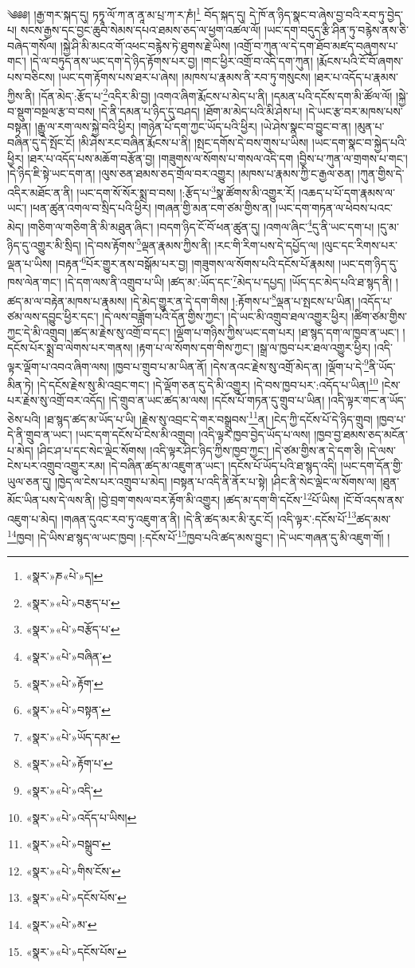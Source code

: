 ༄༅༅། །རྒྱ་གར་སྐད་དུ། ཏཏྭཱ་ལོ་ཀ་ན་ནཱ་མ་པྲ་ཀ་ར་ཎཾ།\footnote{«སྣར་»ཎ«པེ་»ད།} བོད་སྐད་དུ། དེ་ཁོ་ན་ཉིད་སྣང་བ་ཞེས་བྱ་བའི་རབ་ཏུ་བྱེད་པ། སངས་རྒྱས་དང་བྱང་ཆུབ་སེམས་དཔའ་ཐམས་ཅད་ལ་ཕྱག་འཚལ་ལོ། །ཡང་དག་བདུད་རྩི་ཤིན་ཏུ་བརྙེས་ནས་ཅི་བཞེད་གསོལ། །སྐྱེ་ཤི་མི་མངའ་གོ་འཕང་བརྙེས་ཏེ་ཐུགས་རྗེ་ཡིས། །འགྲོ་བ་ཀུན་ལ་དེ་དག་ཐོབ་མཛད་བཞུགས་པ་གང་། །དེ་ལ་བཏུད་ནས་ཡང་དག་དེ་ཉིད་རྟོགས་པར་བྱ། །གང་ཕྱིར་འགྲོ་བ་འདི་དག་ཀུན། །རྨོངས་པའི་ངོ་བོ་ཞགས་པས་བཅིངས། །ཡང་དག་རྟོགས་པས་ཐར་པ་ཞེས། །མཁས་པ་རྣམས་ནི་རབ་ཏུ་གསུངས། །ཐར་པ་འདོད་པ་རྣམས་ཀྱིས་ནི། །དོན་མེད་:རྩོད་པ་\footnote{«སྣར་»«པེ་»བརྩད་པ་}འདིར་མི་བྱ། །འགའ་ཞིག་རྨོངས་པ་མེད་པ་ནི། །དམན་པའི་དངོས་དག་མི་ཚོལ་ལོ། །སྐྱེ་བ་སྡུག་བསྔལ་རྩ་བ་བས། །དེ་ནི་དམན་པ་ཉིད་དུ་བཤད། །ཐོག་མ་མེད་པའི་མི་ཤེས་པ། །དེ་ཡང་རྩ་བར་མཁས་པས་བསྟན། །རྒྱུ་ལ་རག་ལས་སྐྱེ་བའི་ཕྱིར། །གཉེན་པོ་དག་ཀྱང་ཡོད་པའི་ཕྱིར། །ཡེ་ཤེས་སྣང་བ་བྱུང་བ་ན། །མུན་པ་བཞིན་དུ་དེ་སྤོང་ངོ། །མི་ཤེས་རང་བཞིན་རྨོངས་པ་ནི། །སྤང་དགོས་དེ་བས་གུས་པ་ཡིས། །ཡང་དག་སྣང་བ་སྐྱེད་པའི་ཕྱིར། །ཐར་པ་འདོད་པས་མཆོག་བརྩོན་བྱ། །གཟུགས་ལ་སོགས་པ་གསལ་འདི་དག །བྱིས་པ་ཀུན་ལ་གྲགས་པ་གང་། །དེ་ཉིད་ཇི་སྟེ་ཡང་དག་ན། །ལུས་ཅན་ཐམས་ཅད་གྲོལ་བར་འགྱུར། །མཁས་པ་རྣམས་ཀྱི་ང་རྒྱལ་ཅན། །ཀུན་གྱིས་དེ་འདིར་མཐོང་ན་ནི། །ཡང་དག་སོ་སོར་སྨྲ་བ་བས། །:རྩོད་པ་\footnote{«སྣར་»«པེ་»བརྩོད་པ་}སྣ་ཚོགས་མི་འགྱུར་རོ། །འཆད་པ་པོ་དག་རྣམས་ལ་ཡང་། །ཕན་ཚུན་འགལ་བ་སྲིད་པའི་ཕྱིར། །གཞན་གྱི་མན་ངག་ཙམ་གྱིས་ན། །ཡང་དག་གཏན་ལ་ཕེབས་པའང་མེད། །གཅིག་ལ་གཅིག་ནི་མི་མཐུན་ཞིང་། །བདག་ཉིད་ངོ་བོ་ཕན་ཚུན་དུ། །འགལ་ཞིང་\footnote{«སྣར་»«པེ་»བཞིན་}དུ་ནི་ཡང་དག་པ། །དུ་མ་ཉིད་དུ་འགྱུར་མི་སྲིད། །དེ་བས་རྟོགས་\footnote{«སྣར་»«པེ་»རྟོག་}ལྡན་རྣམས་ཀྱིས་ནི། །རང་གི་རིག་པས་དེ་དཔྱོད་ལ། །ལུང་དང་རིགས་པར་ལྡན་པ་ཡིས། །བརྟན་\footnote{«སྣར་»«པེ་»བསྟན་}པོར་གྱུར་ནས་བསྒོམ་པར་བྱ། །གཟུགས་ལ་སོགས་པའི་དངོས་པོ་རྣམས། །ཡང་དག་ཉིད་དུ་ཁས་ལེན་གང་། །དེ་དག་ལས་ནི་འགྲུབ་པ་ཡི། །ཚད་མ་:ཡོད་དང་\footnote{«སྣར་»«པེ་»ཡོད་དམ་}མེད་པ་དཔྱད། །ཡོད་དང་མེད་པའི་ཐ་སྙད་ནི། །
ཚད་མ་ལ་བརྟེན་མཁས་པ་རྣམས། །དེ་མེད་གྱུར་ན་དེ་དག་གིས། །:རྟོགས་པ་\footnote{«སྣར་»«པེ་»རྟོག་པ་}ལྡན་པ་སྤངས་པ་ཡིན། །འདོད་པ་ཙམ་ལས་དབྱུང་ཕྱིར་དང་། །དེ་ལས་བཟློག་པའི་དོན་གྱིས་ཀྱང་། །དེ་ཡང་མི་འགྲུབ་ཐལ་འགྱུར་ཕྱིར། །ཚིག་ཙམ་གྱིས་ཀྱང་དེ་མི་འགྲུབ། །ཚད་མ་རྗེས་སུ་འགྲོ་བ་དང་། །ལྡོག་པ་གཉིས་ཀྱིས་ཡང་དག་པར། །ཐ་སྙད་དག་ལ་ཁྱབ་ན་ཡང་། །དངོས་པོར་སྨྲ་བ་ལེགས་པར་གནས། །རྟག་པ་ལ་སོགས་དག་གིས་ཀྱང་། །སྒྲ་ལ་ཁྱབ་པར་ཐལ་འགྱུར་ཕྱིར། །འདི་ལྟར་ལྡོག་པ་འབའ་ཞིག་ལས། །ཁྱབ་པ་གྲུབ་པ་མ་ཡིན་ནོ། །དེས་ནའང་རྗེས་སུ་འགྲོ་མེད་ན། །ལྡོག་པ་དེ་\footnote{«སྣར་»«པེ་»འདི་}ནི་ཡོད་མིན་ཏེ། །དེ་དངོས་རྗེས་སུ་མི་འབྲང་གང་། །དེ་ལྡོག་ཅན་དུ་དེ་མི་འགྱུར། །དེ་བས་ཁྱབ་པར་:འདོད་པ་ཡིན།\footnote{«སྣར་»«པེ་»འདོད་པ་ཡིས།} །ངེས་པར་རྗེས་སུ་འགྲོ་བར་འདོད། །དེ་གྲུབ་ན་ཡང་ཚད་མ་ལས། །དངོས་པོ་གཏན་དུ་གྲུབ་པ་ཡིན། །འདི་ལྟར་གང་ན་ཡོད་ཅེས་པའི། །ཐ་སྙད་ཚད་མ་ཡོད་པ་ཡི། །རྗེས་སུ་འབྲང་དེ་གར་བསྒྲུབས་\footnote{«སྣར་»«པེ་»བསྒྲུབ་}ན། །ངེད་ཀྱི་དངོས་པོ་དེ་ཉིད་གྲུབ། །ཁྱབ་པ་དེ་ནི་གྲུབ་ན་ཡང་། །ཡང་དག་དངོས་པོ་ངེས་མི་འགྲུབ། །འདི་ལྟར་ཁྱབ་བྱེད་ཡོད་པ་ལས། །ཁྱབ་བྱ་ཐམས་ཅད་མངོན་པ་མེད། །ཤིང་ཤ་པ་དང་སེང་ལྡེང་སོགས། །འདི་ལྟར་ཤིང་ཉིད་ཀྱིས་ཁྱབ་ཀྱང་། །དེ་ཙམ་གྱིས་ན་དེ་དག་ཅི། །དེ་ལས་ངེས་པར་འགྲུབ་འགྱུར་རམ། །དེ་བཞིན་ཚད་མ་འཇུག་ན་ཡང་། །དངོས་པོ་ཡོད་པའི་ཐ་སྙད་འདི། །ཡང་དག་དོན་གྱི་ཡུལ་ཅན་དུ། །ཁྱེད་ལ་ངེས་པར་འགྲུབ་པ་མེད། །བསྟན་པ་འདི་ནི་ནོར་པ་སྟེ། །ཤིང་ནི་སེང་ལྡེང་ལ་སོགས་ལ། །ཐུན་མོང་ཡིན་པས་དེ་ལས་ནི། །བྱེ་བྲག་གསལ་བར་རྟོག་མི་འགྱུར། །ཚད་མ་དག་གི་དངོས་\footnote{«སྣར་»«པེ་»གིས་ངོས་}པོ་ཡིས། །ངོ་བོ་འདས་ནས་འཇུག་པ་མེད། །གཞན་དུའང་རབ་ཏུ་འཇུག་ན་ནི། །དེ་ནི་ཚད་མར་མི་རུང་ངོ། །འདི་ལྟར་:དངོས་པོ་\footnote{«སྣར་»«པེ་»དངོས་པོས་}ཚད་མས་\footnote{«སྣར་»«པེ་»མ་}ཁྱབ། །དེ་ཡིས་ཐ་སྙད་ལ་ཡང་ཁྱབ། །:དངོས་པོ་\footnote{«སྣར་»«པེ་»དངོས་པོས་}ཁྱབ་པའི་ཚད་མས་བྱུང་། །དེ་ཡང་གཞན་དུ་མི་འཇུག་གོ། །
